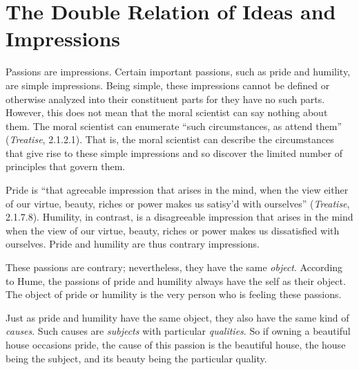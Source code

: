 
\section{The Double Relation of Ideas and Impressions}\label{sec:the_double_relation_of_ideas_and_impressions} %

Passions are impressions. Certain important passions, such as pride and humility, are simple impressions. Being simple, these impressions cannot be defined or otherwise analyzed into their constituent parts for they have no such parts. However, this does not mean that the moral scientist can say nothing about them. The moral scientist can enumerate ``such circumstances, as attend them'' (\emph{Treatise}, 2.1.2.1). That is, the moral scientist can describe the circumstances that give rise to these simple impressions and so discover the limited number of principles that govern them. \change

Pride is ``that agreeable impression that arises in the mind, when the view either of our virtue, beauty, riches or power makes us satisy'd with ourselves'' (\emph{Treatise}, 2.1.7.8). Humility, in contrast, is a disagreeable impression that arises in the mind when the view of our virtue, beauty, riches or power makes us dissatisfied with ourselves. Pride and humility are thus contrary impressions. \change

These passions are contrary; nevertheless, they have the same \emph{object}. According to Hume, the passions of pride and humility always have the self as their object. The object of pride or humility is the very person who is feeling these passions. \change

Just as pride and humility have the same object, they also have the same kind of \emph{causes}. Such causes are \emph{subjects} with particular \emph{qualities}. So if owning a beautiful house occasions pride, the cause of this passion is the beautiful house, the house being the subject, and its beauty being the particular quality. \change

% 


